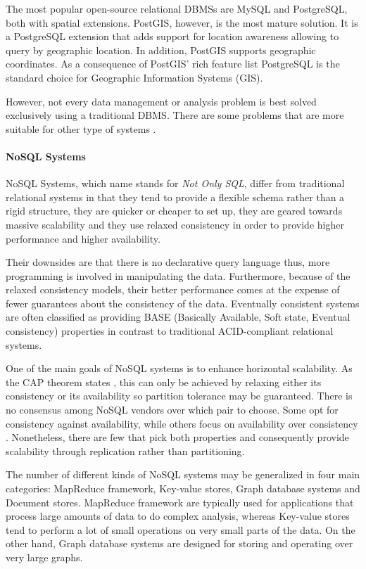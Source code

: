 The most popular open-source relational DBMSs are MySQL and PostgreSQL, both with spatial extensions. PostGIS, however, is the most mature solution. It is a PostgreSQL extension that adds support for location awareness allowing to query by geographic location. In addition, PostGIS supports geographic coordinates. As a consequence of PostGIS' rich feature list PostgreSQL is the standard choice for Geographic Information Systems (GIS).

However, not every data management or analysis problem is best solved exclusively using a traditional DBMS. There are some problems that are more suitable for other type of systems \cite{NoSQL-use-cases}.

\paragraph{NoSQL Systems}

NoSQL Systems, which name stands for \textit{Not Only SQL}, differ from traditional relational systems in that they tend to provide a flexible schema rather than a rigid structure, they are quicker or cheaper to set up, they are geared towards massive scalability and they use relaxed consistency in order to provide higher performance and higher availability.

Their downsides are that there is no declarative query language thus, more programming is involved in manipulating the data. Furthermore, because of the relaxed consistency models, their better performance comes at the expense of fewer guarantees about the consistency of the data. Eventually consistent systems are often classified as providing BASE (Basically Available, Soft state, Eventual consistency) properties in contrast to traditional ACID-compliant relational systems.

One of the main goals of NoSQL systems is to enhance horizontal scalability. As the CAP theorem states \cite{CAP-theorem}\cite{CAP:online}, this can only be achieved by relaxing either its consistency or its availability so partition tolerance may be guaranteed. There is no consensus among NoSQL vendors over which pair to choose. Some opt for consistency against availability, while others focus on availability over consistency \cite{CAP-NoSQL}. Nonetheless, there are few that pick both properties and consequently provide scalability through replication rather than partitioning.

The number of different kinds of NoSQL systems may be generalized in four main categories: MapReduce framework, Key-value stores, Graph database systems and Document stores. MapReduce framework are typically used for applications that process large amounts of data to do complex analysis, whereas Key-value stores tend to perform a lot of small operations on very small parts of the data. On the other hand, Graph database systems are designed for storing and operating over very large graphs.

